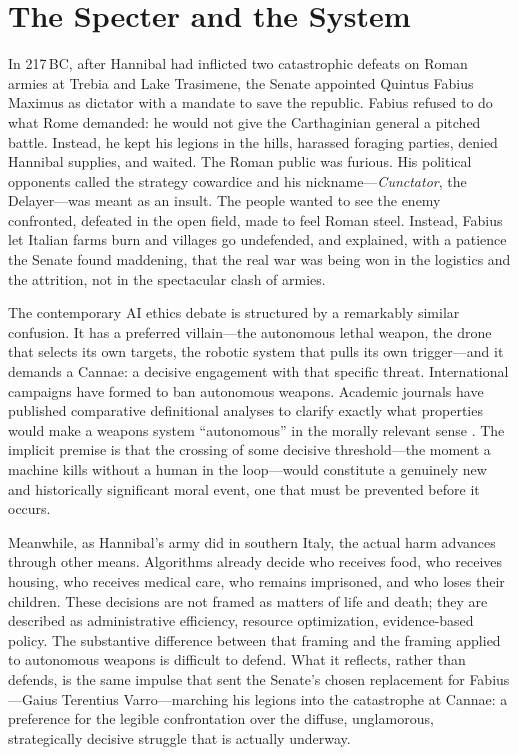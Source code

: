 \documentclass[12pt, a4paper]{article}
\begin{document}
\vspace{3em}

\section{The Specter and the System}

In 217\,BC, after Hannibal had inflicted two catastrophic defeats on Roman armies at Trebia and Lake Trasimene, the Senate appointed Quintus Fabius Maximus as dictator with a mandate to save the republic. Fabius refused to do what Rome demanded: he would not give the Carthaginian general a pitched battle. Instead, he kept his legions in the hills, harassed foraging parties, denied Hannibal supplies, and waited. The Roman public was furious. His political opponents called the strategy cowardice and his nickname---\textit{Cunctator}, the Delayer---was meant as an insult. The people wanted to see the enemy confronted, defeated in the open field, made to feel Roman steel. Instead, Fabius let Italian farms burn and villages go undefended, and explained, with a patience the Senate found maddening, that the real war was being won in the logistics and the attrition, not in the spectacular clash of armies.

The contemporary AI ethics debate is structured by a remarkably similar confusion. It has a preferred villain---the autonomous lethal weapon, the drone that selects its own targets, the robotic system that pulls its own trigger---and it demands a Cannae: a decisive engagement with that specific threat. International campaigns have formed to ban autonomous weapons. Academic journals have published comparative definitional analyses to clarify exactly what properties would make a weapons system \enquote{autonomous} in the morally relevant sense \citep{taddeo2022}. The implicit premise is that the crossing of some decisive threshold---the moment a machine kills without a human in the loop---would constitute a genuinely new and historically significant moral event, one that must be prevented before it occurs.

Meanwhile, as Hannibal's army did in southern Italy, the actual harm advances through other means. Algorithms already decide who receives food, who receives housing, who receives medical care, who remains imprisoned, and who loses their children. These decisions are not framed as matters of life and death; they are described as administrative efficiency, resource optimization, evidence-based policy. The substantive difference between that framing and the framing applied to autonomous weapons is difficult to defend. What it reflects, rather than defends, is the same impulse that sent the Senate's chosen replacement for Fabius---Gaius Terentius Varro---marching his legions into the catastrophe at Cannae: a preference for the legible confrontation over the diffuse, unglamorous, strategically decisive struggle that is actually underway.
\end{document}
